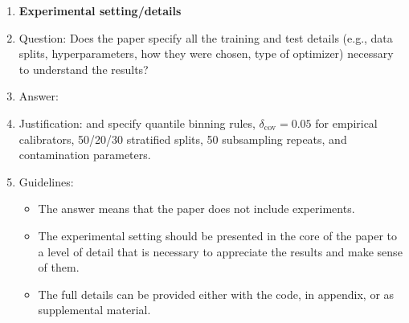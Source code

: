 \documentclass{article}
\theoremstyle{plain}
\theoremstyle{definition}
\theoremstyle{remark}
\begin{document}
\begin{enumerate}
\item {\bf Experimental setting/details}
    \item[] Question: Does the paper specify all the training and test details (e.g., data splits, hyperparameters, how they were chosen, type of optimizer) necessary to understand the results?
    \item[] Answer: \answerYes{}
    \item[] Justification:  and  specify quantile binning rules, $\delta_{\mathrm{cov}}=0.05$ for empirical calibrators, 50/20/30 stratified splits, 50 subsampling repeats, and contamination parameters.
    \item[] Guidelines:
    \begin{itemize}
        \item The answer \answerNA{} means that the paper does not include experiments.
        \item The experimental setting should be presented in the core of the paper to a level of detail that is necessary to appreciate the results and make sense of them.
        \item The full details can be provided either with the code, in appendix, or as supplemental material.
    \end{itemize}


\end{enumerate}
\end{document}
